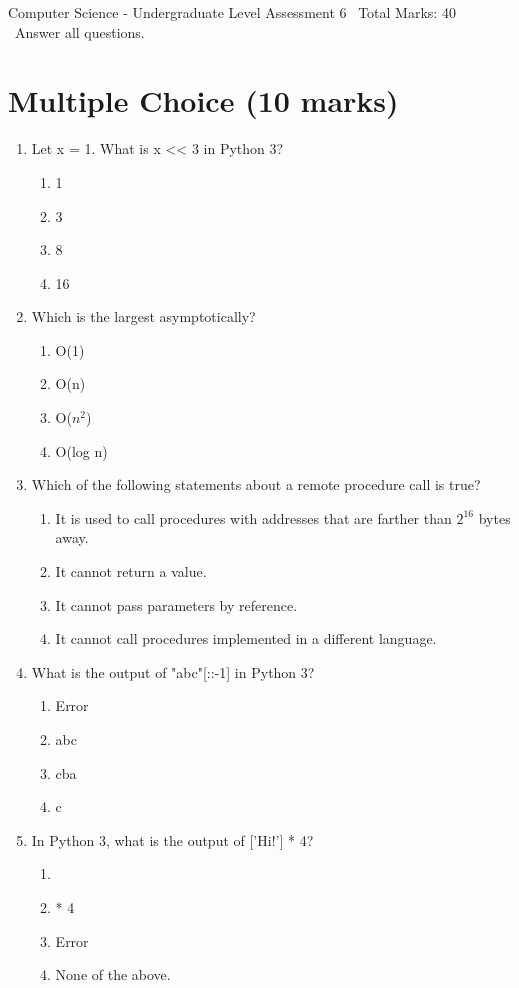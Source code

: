 \documentclass[12pt]{article}
\begin{document}
\begin{center}
Computer Science - Undergraduate Level Assessment 6 \
Total Marks: 40 \
Answer all questions.
\end{center}

\section*{Multiple Choice (10 marks)}
\begin{enumerate}[label=\arabic*.]
\item Let x = 1. What is x \textless{}\textless{} 3 in Python 3?
\begin{enumerate}[label=(\alph*)]
    \item 1
    \item 3
    \item 8
    \item 16
\end{enumerate}
\item Which is the largest asymptotically?
\begin{enumerate}[label=(\alph*)]
    \item O(1)
    \item O(n)
    \item O($n^2$)
    \item O(log n)
\end{enumerate}
\item Which of the following statements about a remote procedure call is true?
\begin{enumerate}[label=(\alph*)]
    \item It is used to call procedures with addresses that are farther than $2^16$ bytes away.
    \item It cannot return a value.
    \item It cannot pass parameters by reference.
    \item It cannot call procedures implemented in a different language.
\end{enumerate}
\item What is the output of "abc"[::-1] in Python 3?
\begin{enumerate}[label=(\alph*)]
    \item Error
    \item abc
    \item cba
    \item c
\end{enumerate}
\item In Python 3, what is the output of ['Hi!'] * 4?
\begin{enumerate}[label=(\alph*)]
    \item ['Hi!', 'Hi!', 'Hi!', 'Hi!']
    \item ['Hi!'] * 4
    \item Error
    \item None of the above.
\end{enumerate}
\end{enumerate}
\end{document}
